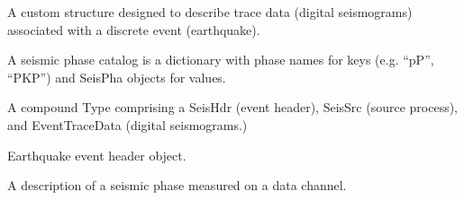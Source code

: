\documentclass[letterpaper,11pt,english]{sphinxmanual}
\begin{document}
\begin{fulllineitems}
\label{\detokenize{src/Submodules/quake:EventTraceData}}
\end{fulllineitems}


A custom structure designed to describe trace data (digital seismograms)
associated with a discrete event (earthquake).

\begin{fulllineitems}
\label{\detokenize{src/Submodules/quake:PhaseCat}}
\end{fulllineitems}


A seismic phase catalog is a dictionary with phase names for keys (e.g. “pP”, “PKP”)
and SeisPha objects for values.

\begin{fulllineitems}
\label{\detokenize{src/Submodules/quake:SeisEvent}}
\end{fulllineitems}


A compound Type comprising a SeisHdr (event header), SeisSrc (source process),
and EventTraceData (digital seismograms.)

\begin{fulllineitems}
\label{\detokenize{src/Submodules/quake:SeisHdr}}
\end{fulllineitems}


Earthquake event header object.

\begin{fulllineitems}
\label{\detokenize{src/Submodules/quake:SeisPha}}
\end{fulllineitems}


A description of a seismic phase measured on a data channel.

\begin{fulllineitems}
\label{\detokenize{src/Submodules/quake:SeisSrc}}
\end{fulllineitems}
\end{document}
